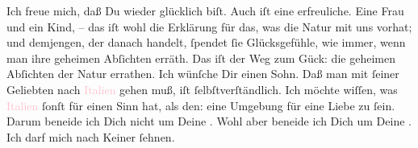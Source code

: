 \pstart
           Ich freue mich, daß Du wieder glücklich \label{K_L03064-3v}\label{K_L03064-3h} biſt.
               Auch \label{K_L03064-4v}\label{K_L03064-4h} iſt \strikeout{\textcolor{gray}{echt}} eine erfreuliche. Eine Frau und ein Kind, – das iſt wohl die  Erklärung für das, was die Natur mit uns vorhat; und demjengen, der danach
               handelt, ſpendet ſie Glücksgefühle, wie immer, wenn man ihre geheimen Abſichten
               erräth. Das iſt der Weg zum Gück: die geheimen Abſichten der Natur errathen. Ich
               wünſche Dir einen Sohn. {\pb}Daß man mit
               ſeiner Geliebten nach \textcolor{pink}{Italien}{}\ledrightnote{\textcolor{pink}{Italien}} gehen muß, iſt
               ſelbſtverſtändlich. Ich möchte wiſſen, was \textcolor{pink}{Italien}{}\ledrightnote{\textcolor{pink}{Italien}} ſonſt \strikeout{\textcolor{gray}{×}\-\textcolor{gray}{×}} für einen Sinn hat, als den: eine Umgebung für eine Liebe zu ſein. Darum
               beneide ich Dich nicht um Deine \label{K_L03064-66v}\label{K_L03064-66h}. Wohl aber beneide ich Dich um Deine \label{K_L03064-23v}\label{K_L03064-23h}. Ich darf mich nach Keiner ſehnen.\pend
           
